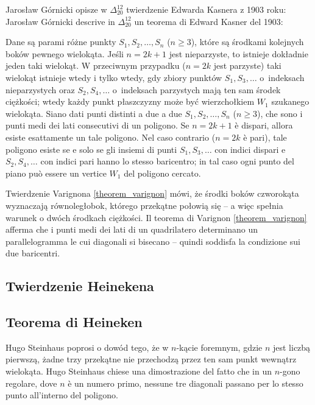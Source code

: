 Jarosław Górnicki opisze w $\Delta_{20}^{12}$ twierdzenie Edwarda Kasnera z 1903 roku: %
Jarosław Górnicki descrive in $\Delta_{20}^{12}$ un teorema di Edward Kasner del 1903: %
%

\begin{proposition}
Dane są parami różne punkty $S_1, S_2, \ldots, S_n$ ($n \ge 3$), które są środkami kolejnych boków pewnego wielokąta. %
Jeśli $n = 2k + 1$ jest nieparzyste, to istnieje dokładnie jeden taki wielokąt. %
W przeciwnym przypadku ($n = 2k$ jest parzyste) taki wielokąt istnieje wtedy i tylko wtedy, gdy zbiory punktów $S_1, S_3, \ldots$ o~indeksach nieparzystych oraz $S_2, S_4, \ldots$ o~indeksach parzystych mają ten sam środek ciężkości; wtedy każdy punkt płaszczyzny może być wierzchołkiem $W_1$ szukanego wielokąta. %
Siano dati punti distinti a due a due $S_1, S_2, \ldots, S_n$ ($n \ge 3$), che sono i punti medi dei lati consecutivi di un poligono. %
Se $n = 2k + 1$ è dispari, allora esiste esattamente un tale poligono. %
Nel caso contrario ($n = 2k$ è pari), tale poligono esiste se e solo se gli insiemi di punti $S_1, S_3, \ldots$ con indici dispari e $S_2, S_4, \ldots$ con indici pari hanno lo stesso baricentro; in tal caso ogni punto del piano può essere un vertice $W_1$ del poligono cercato. %
\end{proposition}

Twierdzenie Varignona \ref{theorem_varignon} mówi, że środki boków czworokąta wyznaczają równoległobok, którego przekątne połowią się -- a więc spełnia warunek o dwóch środkach ciężkości. %
Il teorema di Varignon \ref{theorem_varignon} afferma che i punti medi dei lati di un quadrilatero determinano un parallelogramma le cui diagonali si bisecano -- quindi soddisfa la condizione sui due baricentri. %

\subsection{Twierdzenie Heinekena} %
\subsection{Teorema di Heineken} %

Hugo Steinhaus \cite{steinhaus_1958} poprosi o dowód tego, że w $n$-kącie foremnym, gdzie $n$ jest liczbą pierwszą, żadne trzy przekątne nie przechodzą przez ten sam punkt wewnątrz wielokąta. %
Hugo Steinhaus \cite{steinhaus_1958} chiese una dimostrazione del fatto che in un $n$-gono regolare, dove $n$ è un numero primo, nessune tre diagonali passano per lo stesso punto all'interno del poligono. %
%


